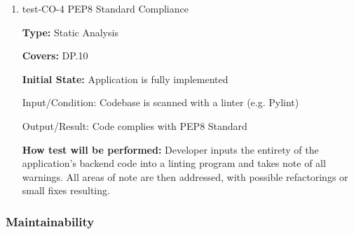 \documentclass[12pt, titlepage]{article}
\begin{document}
\begin{enumerate}
\textbf{Covers:} NF241
					
\textbf{Initial State:} Application open, with a completed project file prepared.
					
Input/Condition: File is open, export is initiated and interrupted
					
Output/Result: Project file remains unaltered
					
\textbf{How test will be performed:} The tester begins the export process on the loaded project file, before intentionally ending the program
in the middle of the export. The project file is then checked against a copy of itself made before the test to see if there are any differences;
if there are no differences, the test is considered a success. 

\item{test-CO-4 PEP8 Standard Compliance\\}
\label{sec:t-nf-13}

\textbf{Type:} Static Analysis

\textbf{Covers:} DP.10
					
\textbf{Initial State:} Application is fully implemented
					
Input/Condition: Codebase is scanned with a linter (e.g. Pylint) %
					
Output/Result: Code complies with PEP8 Standard
					
\textbf{How test will be performed:} Developer inputs the entirety of the application's backend code into a linting program and takes note of all
warnings. All areas of note are then addressed, with possible refactorings or small fixes resulting.

\end{enumerate}

\subsubsection{Maintainability}
\end{document}
